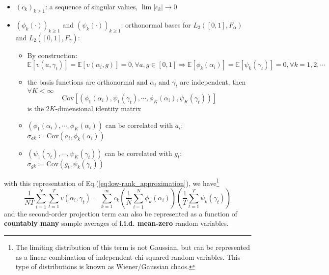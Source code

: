 \documentclass[twoside]{article}
\begin{document}
\begin{itemize}
    \item $(c_k)_{k\geq 1}$: a sequence of singular values, $\lim\left\vert c_k \right\vert \rightarrow 0$
    \item $\left(\phi_k\left(\cdot\right)\right)_{k\geq 1}$ and $\left(\psi_k\left(\cdot\right)\right)_{k\geq 1}$: orthonormal bases for $L_2\left([0,1],F_{\alpha}\right)$ and $L_2\left([0,1],F_{\gamma}\right)$:
    \begin{itemize}
        \item By construction: $$ \mathbb{E}\left[v(a,\gamma_t)\right] = \mathbb{E}\left[v(\alpha_i,g)\right] =0,\forall a,g\in[0,1] \Rightarrow \mathbb{E}\left[\phi_k(\alpha_i)\right] = \mathbb{E}\left[\psi_k(\gamma_t)\right] = 0,\forall k =1,2,\cdots $$
        \item the basis functions are orthonormal and $\alpha_i$ and $\gamma_t$ are independent, then $\forall K<\infty$ $$ \mathrm{Cov}\left[ \left(\phi_1(\alpha_i),\psi_1(\gamma_t), \cdots, \phi_K(\alpha_i),\psi_K(\gamma_t) \right) \right] $$ is the $2K$-dimensional identity matrix
        \item $\left(\phi_1(\alpha_i),\cdots, \phi_K(\alpha_i)\right)$ can be correlated with $a_i$: $\sigma_{ak}\coloneq \mathrm{Cov}\left(a_i,\phi_k(\alpha_i)\right)$
        \item $\left(\psi_1(\gamma_t),\cdots, \psi_K(\gamma_t)\right)$ can be correlated with $g_t$: $\sigma_{gk}\coloneq \mathrm{Cov}\left(g_t,\psi_k(\gamma_t)\right)$
    \end{itemize}
\end{itemize}
with this representation of Eq.(\ref{eq:low-rank_approximation}), we have\footnote{The limiting distribution of this term is not Gaussian, but can be represented as a linear combination of independent chi-squared random variables. This type of distributions is known as Wiener/Gaussian chaos.} 
\begin{equation*}
    \frac{1}{NT}\sum^N_{i=1}\sum^T_{t=1}v(\alpha_i,\gamma_t) = \sum^{\infty}_{k=1}c_k \left(\frac{1}{N}\sum^N_{i=1}\phi_k(\alpha_i)\right) \left(\frac{1}{T}\sum^T_{t=1}\psi_k(\gamma_t)\right)
\end{equation*}
and the second-order projection term can also be represented as a function of \textbf{countably many} sample averages of \textbf{i.i.d. mean-zero} random variables.
\end{document}
